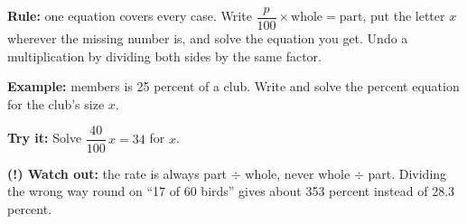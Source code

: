 \documentclass[12pt]{article}
\begin{document}

\begin{formulabox}
\textbf{Rule:} one equation covers every case. Write
$\dfrac{p}{100} \times \text{whole} = \text{part}$, put the letter $x$ wherever
the missing number is, and solve the equation you get. Undo a multiplication by
dividing both sides by the same factor.
\end{formulabox}

\begin{examplebox}
\textbf{Example:}  members is 25 percent of a club. Write and solve the
percent equation for the club's size $x$.
\end{examplebox}

\begin{tryitbox}
\textbf{Try it:} \quad Solve $\dfrac{40}{100}\,x = 34$ for $x$.\\[2pt]
\end{tryitbox}

\begin{watchoutbox}
\textbf{(!) Watch out:} the rate is always part $\div$ whole, never whole
$\div$ part. Dividing the wrong way round on ``17 of 60 birds'' gives about 353
percent instead of 28.3 percent.
\end{watchoutbox}
\end{document}
